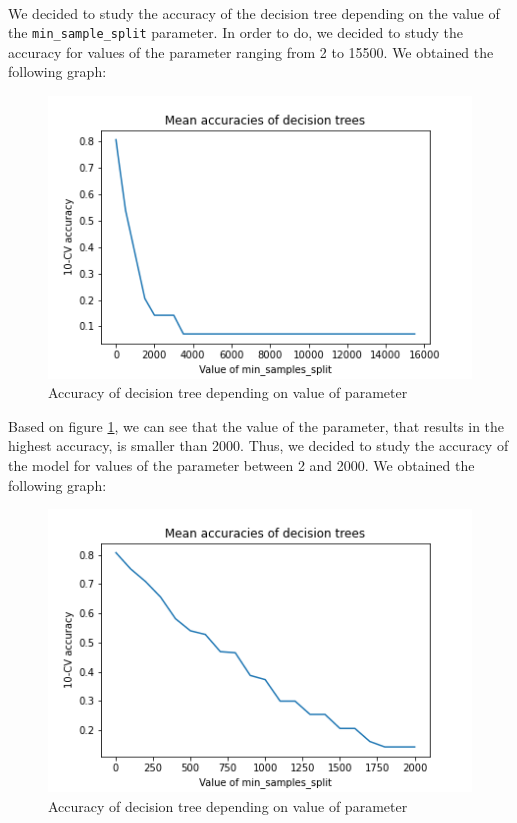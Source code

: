 \documentclass[a4paper, 11pt, oneside]{article}
\begin{document}
\paragraph{}We decided to study the accuracy of the decision tree depending on the value of the \texttt{min\_sample\_split} parameter. In order to do, we decided to study the accuracy for values of the parameter ranging from 2 to 15500. We obtained the following graph:
\begin{figure}[H]
\centering
\includegraphics[scale=0.4]{dt/dt_basic_accuracies_1.png}
\caption{Accuracy of decision tree depending on value of parameter}
\label{fig:dt_acc_1}
\end{figure}
Based on figure \ref{fig:dt_acc_1}, we can see that the value of the parameter, that results in the highest accuracy, is smaller than 2000. Thus, we decided to study the accuracy of the model for values of the parameter between 2 and 2000. We obtained the following graph:
\begin{figure}[H]
\centering
\includegraphics[scale=0.4]{dt/dt_basic_accuracies_2.png}
\caption{Accuracy of decision tree depending on value of parameter}
\end{figure}
\end{document}
